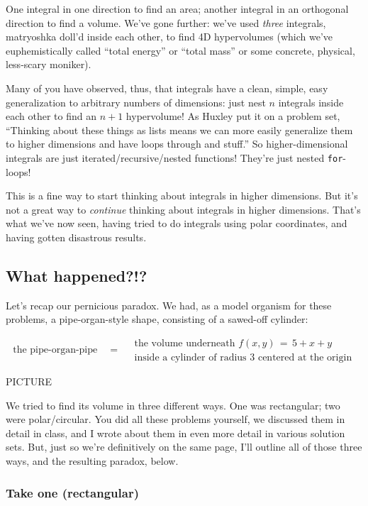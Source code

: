 \documentclass[
]{article}
\begin{document}
One integral in one direction to find an area; another integral in an orthogonal direction to find a volume. We've gone further: we've used \emph{three} integrals, matryoshka doll'd inside each other, to find 4D hypervolumes (which we've euphemistically called ``total energy'' or ``total mass'' or some concrete, physical, less-scary moniker).

Many of you have observed, thus, that integrals have a clean, simple, easy generalization to arbitrary numbers of dimensions: just nest \(n\) integrals inside each other to find an \(n+1\) hypervolume! As Huxley put it on a problem set, ``Thinking about these things as lists means we can more easily generalize them to higher dimensions and have loops through and stuff.'' So higher-dimensional integrals are just iterated/recursive/nested functions! They're just nested \texttt{for}-loops!

This is a fine way to start thinking about integrals in higher dimensions. But it's not a great way to \emph{continue} thinking about integrals in higher dimensions. That's what we've now seen, having tried to do integrals using polar coordinates, and having gotten disastrous results.

\hypertarget{what-happened}{%
\subsection{What happened?!?}\label{what-happened}}

Let's recap our pernicious paradox. We had, as a model organism for these problems, a pipe-organ-style shape, consisting of a sawed-off cylinder:

\[\text{the pipe-organ-pipe} \quad=\quad \substack{\text{the volume underneath $f(x,y)\,=\,5+x+y$}\\\text{inside a cylinder of radius $3$ centered at the origin}}\]

PICTURE

We tried to find its volume in three different ways. One was rectangular; two were polar/circular. You did all these problems yourself, we discussed them in detail in class, and I wrote about them in even more detail in various solution sets. But, just so we're definitively on the same page, I'll outline all of those three ways, and the resulting paradox, below.

\hypertarget{take-one-rectangular}{%
\subsubsection{Take one (rectangular)}\label{take-one-rectangular}}
\end{document}
